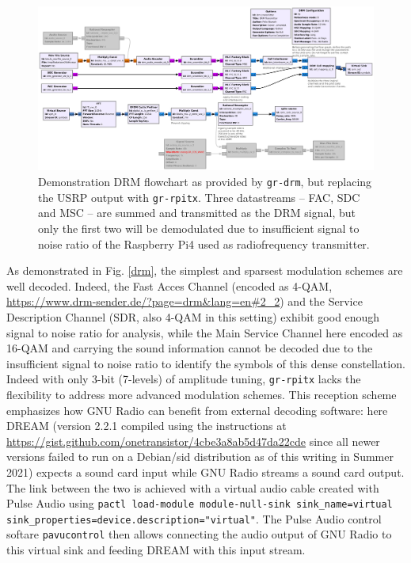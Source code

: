 \documentclass{article}
\begin{document}
\begin{figure}[h!tb]
\includegraphics[width=\linewidth]{drm_transmitter.pdf}
\caption{Demonstration DRM flowchart as provided by {\tt gr-drm}, but replacing 
the USRP output with {\tt gr-rpitx}. Three datastreams -- FAC, SDC and MSC -- are 
summed and transmitted as the DRM signal, but only the first two will be demodulated
due to insufficient signal to noise ratio of the Raspberry Pi4 used as radiofrequency
transmitter.}
\label{drmtx}
\end{figure}

As demonstrated in Fig.
\ref{drm}, the simplest and sparsest modulation schemes are well decoded. Indeed, the Fast 
Acces Channel (encoded as 4-QAM, \url{https://www.drm-sender.de/?page=drm&lang=en#2_2}) 
and the Service Description Channel (SDR, also 4-QAM in this setting) exhibit good enough 
signal to noise ratio for analysis, while the Main Service Channel here encoded as 16-QAM 
and carrying the sound information cannot be decoded due to the insufficient signal to noise 
ratio to identify the symbols of this dense constellation.
Indeed with only 3-bit (7-levels) of amplitude tuning, {\tt gr-rpitx} lacks
the flexibility to address more advanced modulation schemes. This reception
scheme emphasizes how GNU Radio can benefit from external decoding software:
here DREAM (version 2.2.1 compiled using the instructions at
\url{https://gist.github.com/onetransistor/4cbe3a8ab5d47da22cde} since all
newer versions failed to run on a Debian/sid distribution as of this writing in
Summer 2021) expects a sound card input while GNU Radio streams a
sound card output. The link between the two is achieved with a virtual audio
cable created with Pulse Audio using
{\tt pactl load-module module-null-sink sink\_name=virtual 
sink\_properties=device.description="virtual"}. The Pulse Audio control softare
{\tt pavucontrol} then allows connecting the audio output of GNU Radio to this
virtual sink and feeding DREAM with this input stream.
\end{document}
